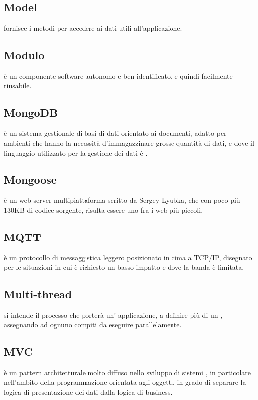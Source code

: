 \documentclass[12pt,a4paper]{article}
\begin{document}
\subsection{Model} 
 fornisce i metodi per accedere ai dati utili all'applicazione.

\subsection{Modulo} 
 è un componente software autonomo e ben identificato, e quindi facilmente riusabile.

\subsection{MongoDB} 
 è un sistema gestionale di basi di dati  orientato ai documenti, adatto per ambienti che hanno la necessità d'immagazzinare grosse quantità di dati, e dove il linguaggio utilizzato per la gestione dei dati è .

\subsection{Mongoose} 
 è un web server multipiattaforma scritto da Sergey Lyubka, che con poco più 130KB di codice sorgente, risulta essere uno fra i  web più piccoli.

\subsection{MQTT} 
 è un protocollo di messaggistica leggero posizionato in cima a TCP/IP, disegnato per le situazioni in cui è richiesto un basso impatto e dove la banda è limitata.

\subsection{Multi-thread} 
 si intende il processo che porterà un' applicazione, a definire più di un , assegnando ad ognuno compiti da eseguire parallelamente.

\subsection{MVC} 
 è un pattern architetturale molto diffuso nello sviluppo di sistemi , in particolare nell'ambito della programmazione orientata agli oggetti, in grado di separare la logica di presentazione dei dati dalla logica di business.
\end{document}
